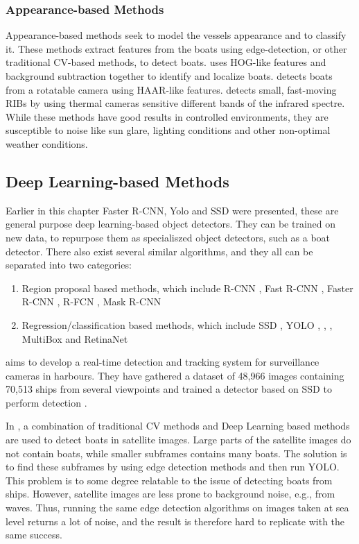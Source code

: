 \subsubsection{Appearance-based Methods}
Appearance-based methods seek to model the vessels appearance and to classify it. These methods extract features from the boats using edge-detection, or other traditional CV-based methods, to detect boats. \citep{HOGdetection} uses HOG-like features and background subtraction together to identify and localize boats. \citep{HAARdetection} detects boats from a rotatable camera using HAAR-like features. \citep{RIBDetection} detects small, fast-moving RIBs by using thermal cameras sensitive different bands of the infrared spectre. While these methods have good results in controlled environments, they are susceptible to noise like sun glare, lighting conditions and other non-optimal weather conditions. 


\subsection{Deep Learning-based Methods}
Earlier in this chapter Faster R-CNN, Yolo and SSD were presented, these are general purpose deep learning-based object detectors. They can be trained on new data, to repurpose them as specialiszed object detectors, such as a boat detector. There also exist several similar algorithms, and they all can be separated into two categories:

\begin{enumerate}
\item Region proposal based methods, which include R-CNN \citep{R-CNN}, Fast R-CNN \citep{FastR-CNN}, Faster R-CNN \citep{FasterR-CNN}, R-FCN \citep{R-FCN}, Mask R-CNN \citep{MaskRCNN}
\item Regression/classification based methods, which include SSD \citep{SSD}, YOLO \citep{YOLOv1}, \citep{YOLOv2}, \citep{YOLOv3}, MultiBox \citep{Multibox} and RetinaNet \citep{Retinanet}
\end{enumerate}

\noindent
\citep{SSD_detection2018} aims to develop a real-time detection and tracking system for surveillance cameras in harbours. They have gathered a dataset of 48,966 images containing 70,513 ships from several viewpoints and trained a detector based on SSD to perform detection \citep{SSD}. 

\vspace{3mm}

\noindent
In \citep{VanEtten2018}, a combination of traditional CV methods and Deep Learning based methods are used to detect boats in satellite images. Large parts of the satellite images do not contain boats, while smaller subframes contains many boats. The solution is to find these subframes by using edge detection methods and then run YOLO. This problem is to some degree relatable to the issue of detecting boats from ships. However, satellite images are less prone to background noise, e.g., from waves. Thus, running the same edge detection algorithms on images taken at sea level returns a lot of noise, and the result is therefore hard to replicate with the same success.

